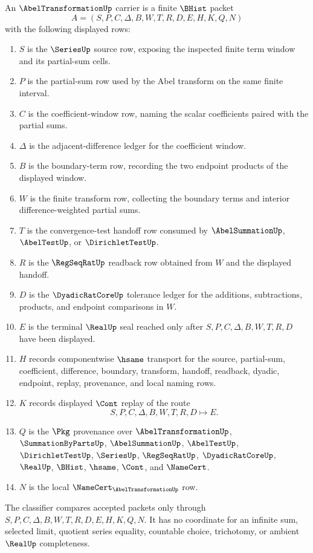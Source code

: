 \begin{definition}
\label{def:abel-transformation-carrier}
An $\AbelTransformationUp$ carrier is a finite $\BHist$ packet
$$
A=(S,P,C,\Delta,B,W,T,R,D,E,H,K,Q,N)
$$
with the following displayed rows:
\begin{enumerate}
\item $S$ is the $\SeriesUp$ source row, exposing the inspected finite term window and its partial-sum cells.
\item $P$ is the partial-sum row used by the Abel transform on the same finite interval.
\item $C$ is the coefficient-window row, naming the scalar coefficients paired with the partial sums.
\item $\Delta$ is the adjacent-difference ledger for the coefficient window.
\item $B$ is the boundary-term row, recording the two endpoint products of the displayed window.
\item $W$ is the finite transform row, collecting the boundary terms and interior difference-weighted partial sums.
\item $T$ is the convergence-test handoff row consumed by $\AbelSummationUp$, $\AbelTestUp$, or $\DirichletTestUp$.
\item $R$ is the $\RegSeqRatUp$ readback row obtained from $W$ and the displayed handoff.
\item $D$ is the $\DyadicRatCoreUp$ tolerance ledger for the additions, subtractions, products, and endpoint comparisons in $W$.
\item $E$ is the terminal $\RealUp$ seal reached only after $S,P,C,\Delta,B,W,T,R,D$ have been displayed.
\item $H$ records componentwise $\hsame$ transport for the source, partial-sum, coefficient, difference, boundary, transform, handoff, readback, dyadic, endpoint, replay, provenance, and local naming rows.
\item $K$ records displayed $\Cont$ replay of the route
$$
S,P,C,\Delta,B,W,T,R,D \longmapsto E .
$$
\item $Q$ is the $\Pkg$ provenance over $\AbelTransformationUp$, $\SummationByPartsUp$, $\AbelSummationUp$, $\AbelTestUp$, $\DirichletTestUp$, $\SeriesUp$, $\RegSeqRatUp$, $\DyadicRatCoreUp$, $\RealUp$, $\BHist$, $\hsame$, $\Cont$, and $\NameCert$.
\item $N$ is the local $\NameCert_{\AbelTransformationUp}$ row.
\end{enumerate}
The classifier compares accepted packets only through $S,P,C,\Delta,B,W,T,R,D,E,H,K,Q,N$. It has no coordinate for an infinite sum, selected limit, quotient series equality, countable choice, trichotomy, or ambient $\RealUp$ completeness.
\end{definition}

